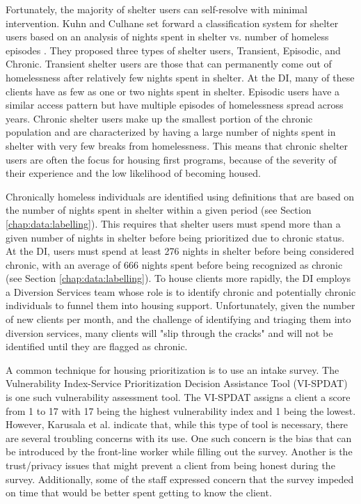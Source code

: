 Fortunately, the majority of shelter users can self-resolve with minimal intervention. Kuhn and Culhane set forward a classification system for shelter users based on an analysis of nights spent in shelter vs. number of homeless episodes \cite{kuhn1998applying}. They proposed three types of shelter users, Transient, Episodic, and Chronic. Transient shelter users are those that can permanently come out of homelessness after relatively few nights spent in shelter. At the DI, many of these clients have as few as one or two nights spent in shelter. Episodic users have a similar access pattern but have multiple episodes of homelessness spread across years. Chronic shelter users make up the smallest portion of the chronic population and are characterized by having a large number of nights spent in shelter with very few breaks from homelessness. This means that chronic shelter users are often the focus for housing first programs, because of the severity of their experience and the low likelihood of becoming housed.

Chronically homeless individuals are identified using definitions that are based on the number of nights spent in shelter within a given period (see Section \ref{chap:data:labelling}). This requires that shelter users must spend more than a given number of nights in shelter before being prioritized due to chronic status. At the DI, users must spend at least 276 nights in shelter before being considered chronic, with an average of 666 nights spent before being recognized as chronic (see Section \ref{chap:data:labelling}). To house clients more rapidly, the DI employs a Diversion Services team whose role is to identify chronic and potentially chronic individuals to funnel them into housing support. Unfortunately, given the number of new clients per month, and the challenge of identifying and triaging them into diversion services, many clients will "slip through the cracks" and will not be identified until they are flagged as chronic.

A common technique for housing prioritization is to use an intake survey. The Vulnerability Index-Service Prioritization Decision Assistance Tool (VI-SPDAT)  is one such \cite{levitt2015assessment} \cite{brown2018reliability} vulnerability assessment tool. The VI-SPDAT assigns a client a score from 1 to 17 with 17 being the highest vulnerability index and 1 being the lowest. However, Karusala et al. \cite{karusala2019street} indicate that, while this type of tool is necessary, there are several troubling concerns with its use. One such concern is the bias that can be introduced by the front-line worker while filling out the survey. Another is the trust/privacy issues that might prevent a client from being honest during the survey. Additionally, some of the staff expressed concern that the survey impeded on time that would be better spent getting to know the client.

